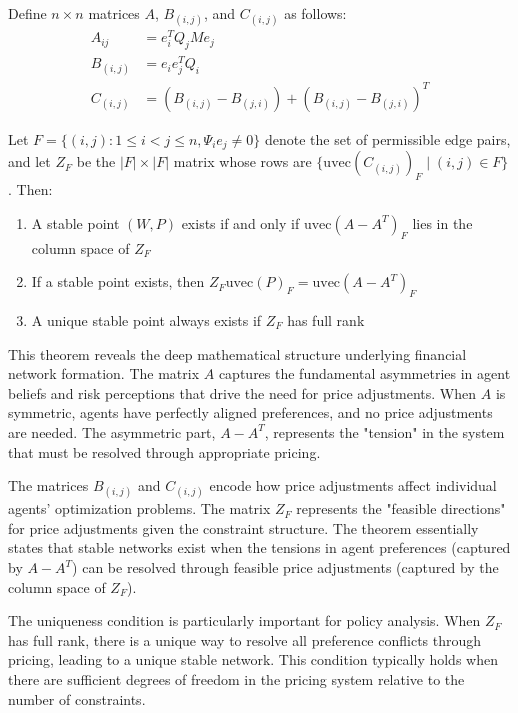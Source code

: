 \begin{theorem}
\label{thm:original_existence}
Define $n \times n$ matrices $A$, $B_{(i,j)}$, and $C_{(i,j)}$ as follows:
\begin{align}
A_{ij} &= e_i^T Q_j M e_j \label{eq:original_A_matrix}\\
B_{(i,j)} &= e_i e_j^T Q_i \label{eq:original_B_matrix}\\
C_{(i,j)} &= (B_{(i,j)} - B_{(j,i)}) + (B_{(i,j)} - B_{(j,i)})^T \label{eq:original_C_matrix}
\end{align}

Let $F = \{(i,j) : 1 \leq i < j \leq n, \Psi_i e_j \neq 0\}$ denote the set of permissible edge pairs, and let $Z_F$ be the $|F| \times |F|$ matrix whose rows are $\{\text{uvec}(C_{(i,j)})_F \mid (i,j) \in F\}$. Then:

\begin{enumerate}
   \item A stable point $(W, P)$ exists if and only if $\text{uvec}(A - A^T)_F$ lies in the column space of $Z_F$
   \item If a stable point exists, then $Z_F\text{uvec}(P)_F = \text{uvec}(A - A^T)_F$
   \item A unique stable point always exists if $Z_F$ has full rank
\end{enumerate}
\end{theorem}

This theorem reveals the deep mathematical structure underlying financial network formation. The matrix $A$ captures the fundamental asymmetries in agent beliefs and risk perceptions that drive the need for price adjustments. When $A$ is symmetric, agents have perfectly aligned preferences, and no price adjustments are needed. The asymmetric part, $A - A^T$, represents the "tension" in the system that must be resolved through appropriate pricing.

The matrices $B_{(i,j)}$ and $C_{(i,j)}$ encode how price adjustments affect individual agents' optimization problems. The matrix $Z_F$ represents the "feasible directions" for price adjustments given the constraint structure. The theorem essentially states that stable networks exist when the tensions in agent preferences (captured by $A - A^T$) can be resolved through feasible price adjustments (captured by the column space of $Z_F$).

The uniqueness condition is particularly important for policy analysis. When $Z_F$ has full rank, there is a unique way to resolve all preference conflicts through pricing, leading to a unique stable network. This condition typically holds when there are sufficient degrees of freedom in the pricing system relative to the number of constraints.



